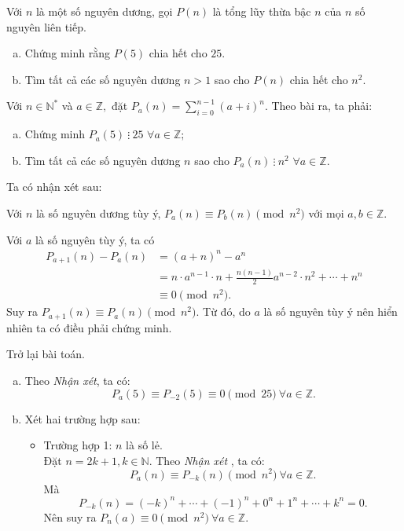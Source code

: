 \begin{bt}%
Với $n$ là một số nguyên dương, gọi $P(n)$ là tổng lũy thừa bậc $n$ của $n$ số nguyên liên tiếp.
\begin{enumerate}[a)]
\item Chứng minh rằng $P(5)$ chia hết cho $25.$
\item Tìm tất cả các số nguyên dương $n>1$ sao cho $P(n)$ chia hết cho $n^2.$
\end{enumerate}
\loigiai
{
Với $n\in\mathbb{N^*}$ và $a\in\mathbb{Z},$ đặt 
$\displaystyle P_a(n)=\sum\limits_{i=0}^{n-1}(a+i)^n .$ Theo bài ra, ta phải:
\begin{enumerate}[a)]
\item Chứng minh $P_a(5) \ \vdots \  25$ $\forall a\in\mathbb{Z};$
\item Tìm tất cả các số nguyên dương $n$ sao cho $P_a(n) \ \vdots \  n^2$ $\forall a\in\mathbb{Z}.$
\end{enumerate}
Ta có nhận xét sau:
\begin{nx}
Với $n$ là số nguyên dương tùy ý, $P_a(n) \equiv P_b(n) \pmod {n^2}$ với mọi $a,b \in\mathbb{Z}.$
\begin{cm}
Với $a$ là số nguyên tùy ý, ta có 
{\allowdisplaybreaks
\begin{align*}
P_{a+1}(n)-P_a(n)&
 =(a+n)^n-a^n\\
&=n\cdot a^{n-1}\cdot n+\frac{n(n-1)}{2}a^{n-2}\cdot n^2+\dotsb +n^n\\
&\equiv 0 \pmod{n^2}.
\end{align*}}Suy ra $P_{a+1}(n) \equiv P_a(n) \pmod {n^2}.$ Từ đó, do $a$ là số nguyên tùy ý nên hiển nhiên ta có điều phải chứng minh.
\end{cm}
\end{nx}
Trở lại bài toán.\\
\begin{enumerate}[a)]
\item Theo \textit{Nhận xét}, ta có:
$$ P_a(5) \equiv P_{-2}(5)\equiv 0 \pmod{25} \ \forall a\in\mathbb{Z}. $$
\item Xét hai trường hợp sau:
\begin{itemize}
\item Trường hợp 1: $n$ là số lẻ.\\
Đặt $n=2k+1, k\in\mathbb{N}.$ Theo \textit{Nhận xét }, ta có:
$$P_a(n) \equiv P_{-k}(n) \pmod{n^2} \ \forall a\in\mathbb{Z}.$$ Mà 
$$ P_{-k}(n)=(-k)^n+\dotsb +(-1)^n+0^n+1^n+\dotsb +k^n=0. $$ Nên suy ra $P_n(a)\equiv 0 \pmod{n^2} \ \forall a\in\mathbb{Z}. $

\end{itemize}
\end{enumerate}}
\end{bt}

